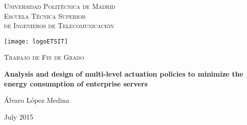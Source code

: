 \makeatletter
\def\@department{Departamento de Ingeniería Electrónica}
\def\@university{Universidad Politécnica de Madrid}
\def\@school{Escuela Técnica Superior \\de Ingenieros de Telecomunicación}

\def\@author{Álvaro López Medina}
\def\@tutor{Dña. Marina Zapater Sancho}
\def\@advisor{D. Jose Manuel Moya Fernández}

\def\@presidente{D. Rubén San Segundo Hernández}
\def\@vocal{D. José Manuel Moya Fernández}
\def\@secretario{D. Juan Mariano de Goyeneche y Vázquez de Seyas}
\def\@suplente{D. Juan Manuel Montero Martínez}

\def\@logo{logoETSIT}
\def\@title{Analysis and design of multi-level actuation policies to minimize the energy consumption of enterprise servers}
\def\@degree{Trabajo de Fin de Grado}
\def\@date{July 2015} 



\begin{titlepage}


{\centering\scshape\setlength{\parindent}{0cm} \LARGE \@university\\[20mm]}
{\centering\scshape\setlength{\parindent}{0cm} \Large \@school\\[10mm]}

\begin{center}

\texttt{[image: logoETSIT]}


\vspace{1cm}

{\Huge \centering \scshape \@degree\\[1cm]}

{\Huge \bfseries \@title \par}

 \vspace{3cm}


{\large\sc \@author \\[1cm]}

{\large\sc \@date}\\

\end{center}
\end{titlepage}



